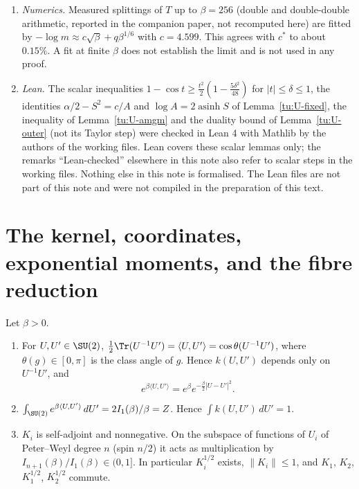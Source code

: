\begin{enumerate}
$\beta=10^{16}$. These numbers are measurements of the explicit bounds, not of the operator.
\item \emph{Numerics.} Measured splittings of $T$ up to $\beta=256$ (double and double-double
arithmetic, reported in the companion paper, not recomputed here) are fitted by
$-\log m\approx c\sqrt\beta+q\beta^{1/6}$ with $c=4.599$. This agrees with $c^*$ to about
$0.15\%$. A fit at finite $\beta$ does not establish the limit and is not used in any proof.
\item \emph{Lean.} The scalar inequalities $1-\cos t\ge\frac{t^2}{2}(1-\frac{5\delta^2}{48})$ for
$|t|\le\delta\le1$, the identities $\alpha/2-S^2=c/A$ and $\log A=2\operatorname{asinh}S$ of
Lemma~\ref{tu:U-fixed}, the inequality of Lemma~\ref{tu:U-amgm} and the duality bound of
Lemma~\ref{tu:U-outer} (not its Taylor step) were checked in Lean 4 with Mathlib by the authors of the
working files. Lean covers these scalar lemmas only; the remarks ``Lean-checked'' elsewhere in this note
also refer to scalar steps in the working files. Nothing else in this note is formalised. The Lean files are
not part of this note and were not compiled in the preparation of this text.
\end{enumerate}

\section{The kernel, coordinates, exponential moments, and the fibre reduction}\label{tu:U-sec-kernel}

\begin{lemma}\label{tu:U-kernel}
Let $\beta>0$.
\begin{enumerate}
\item For $U,U'\in\SU(2)$, $\tfrac12\Tr(U^{-1}U')=\langle U,U'\rangle=\cos\theta(U^{-1}U')$, where
$\theta(g)\in[0,\pi]$ is the class angle of $g$. Hence $k(U,U')$ depends only on $U^{-1}U'$, and
\[
e^{\beta\langle U,U'\rangle}=e^{\beta}e^{-\frac\beta2|U-U'|^2}.
\]
\item $\int_{\SU(2)}e^{\beta\langle U,U'\rangle}\,dU'=2I_1(\beta)/\beta=Z$. Hence $\int k(U,U')\,dU'=1$.
\item $K_i$ is self-adjoint and nonnegative. On the subspace of functions of $U_i$ of Peter--Weyl degree
$n$ (spin $n/2$) it acts as multiplication by $I_{n+1}(\beta)/I_1(\beta)\in(0,1]$. In particular
$K_i^{1/2}$ exists, $\|K_i\|\le1$, and $K_1$, $K_2$, $K_1^{1/2}$, $K_2^{1/2}$ commute.
\end{enumerate}
\end{lemma}

